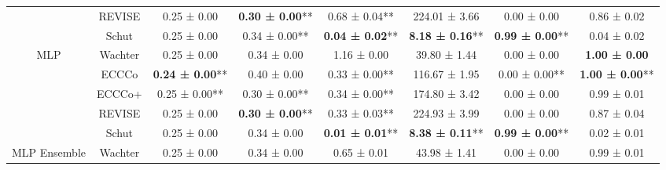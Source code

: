 \begin{table}
{\begin{tabular}[t]{cccccccc}
 & REVISE & 0.25 ± 0.00\hphantom{*}\hphantom{*} & \textbf{0.30 ± 0.00}** & 0.68 ± 0.04** & 224.01 ± 3.66\hphantom{*}\hphantom{*} & 0.00 ± 0.00\hphantom{*}\hphantom{*} & 0.86 ± 0.02\hphantom{*}\hphantom{*}\\

 & Schut & 0.25 ± 0.00\hphantom{*}\hphantom{*} & 0.34 ± 0.00** & \textbf{0.04 ± 0.02}** & \textbf{8.18 ± 0.16}** & \textbf{0.99 ± 0.00}** & 0.04 ± 0.02\hphantom{*}\hphantom{*}\\

\multirow[t]{-5}{*}{\centering\arraybackslash MLP} & Wachter & 0.25 ± 0.00\hphantom{*}\hphantom{*} & 0.34 ± 0.00\hphantom{*}\hphantom{*} & 1.16 ± 0.00\hphantom{*}\hphantom{*} & 39.80 ± 1.44\hphantom{*}\hphantom{*} & 0.00 ± 0.00\hphantom{*}\hphantom{*} & \textbf{1.00 ± 0.00}\hphantom{*}\hphantom{*}\\
\cmidrule{1-8}
 & ECCCo & \textbf{0.24 ± 0.00}** & 0.40 ± 0.00\hphantom{*}\hphantom{*} & 0.33 ± 0.00** & 116.67 ± 1.95\hphantom{*}\hphantom{*} & 0.00 ± 0.00** & \textbf{1.00 ± 0.00}**\\

 & ECCCo+ & 0.25 ± 0.00** & 0.30 ± 0.00** & 0.34 ± 0.00** & 174.80 ± 3.42\hphantom{*}\hphantom{*} & 0.00 ± 0.00\hphantom{*}\hphantom{*} & 0.99 ± 0.01\hphantom{*}\hphantom{*}\\

 & REVISE & 0.25 ± 0.00\hphantom{*}\hphantom{*} & \textbf{0.30 ± 0.00}** & 0.33 ± 0.03** & 224.93 ± 3.99\hphantom{*}\hphantom{*} & 0.00 ± 0.00\hphantom{*}\hphantom{*} & 0.87 ± 0.04\hphantom{*}\hphantom{*}\\

 & Schut & 0.25 ± 0.00\hphantom{*}\hphantom{*} & 0.34 ± 0.00\hphantom{*}\hphantom{*} & \textbf{0.01 ± 0.01}** & \textbf{8.38 ± 0.11}** & \textbf{0.99 ± 0.00}** & 0.02 ± 0.01\hphantom{*}\hphantom{*}\\

\multirow[t]{-5}{*}{\centering\arraybackslash MLP Ensemble} & Wachter & 0.25 ± 0.00\hphantom{*}\hphantom{*} & 0.34 ± 0.00\hphantom{*}\hphantom{*} & 0.65 ± 0.01\hphantom{*}\hphantom{*} & 43.98 ± 1.41\hphantom{*}\hphantom{*} & 0.00 ± 0.00\hphantom{*}\hphantom{*} & 0.99 ± 0.01\hphantom{*}\hphantom{*}\\
\bottomrule
\end{tabular}}
\end{table}

